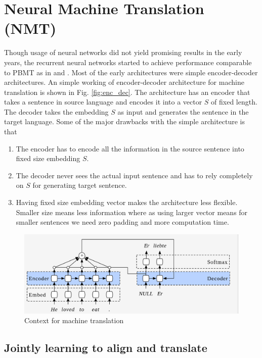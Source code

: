 \documentclass[a4paper]{article}
\begin{document}
\section{Neural Machine Translation (NMT)}

Though usage of  neural networks did  not  yield  promising results in the early
years, the recurrent neural networks started to  achieve  performance comparable
to       PBMT       as       in       \cite{kalchbrenner2013recurrent}       and
\cite{hermann2013multilingual}. Most  of  the  early architectures  were  simple
encoder-decoder architectures. An simple working of encoder-decoder architecture
for machine translation is shown in Fig. \ref{fig:enc_dec}. The architecture has
an encoder that takes a sentence in source language and encodes it into a vector
$S$ of fixed length. The decoder takes the embedding $S$ as  input and generates
the sentence in the target language. Some of the major drawbacks with the simple
architecture is that


\begin{enumerate}
  \item The  encoder  has to  encode all the  information in the source sentence
        into fixed size embedding $S$.
  \item The decoder  never  sees  the  actual  input  sentence  and  has to rely
        completely on $S$ for generating target sentence.
  \item Having fixed size embedding vector makes the architecture less flexible.
        Smaller size means less  information where  as using larger vector means
        for smaller sentences we need zero padding and more computation time.
\end{enumerate}


\begin{figure}
  \includegraphics[width=.99\linewidth]{img/context.png}
  \caption{Context for machine translation}
  \label{fig:context}
\end{figure}


\subsection{Jointly learning to align and translate} \label{sec:JT}
\end{document}
